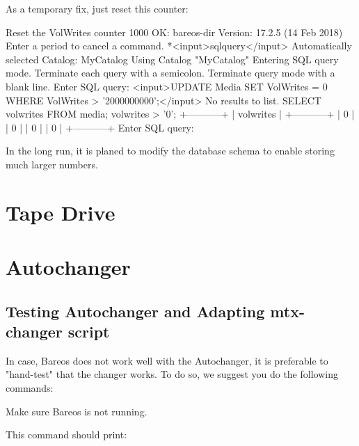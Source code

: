 As a temporary fix, just reset this counter:

\begin{bconsole}{Reset the VolWrites counter}
1000 OK: bareos-dir Version: 17.2.5 (14 Feb 2018)
Enter a period to cancel a command.
*<input>sqlquery</input>
Automatically selected Catalog: MyCatalog
Using Catalog "MyCatalog"
Entering SQL query mode.
Terminate each query with a semicolon.
Terminate query mode with a blank line.
Enter SQL query: <input>UPDATE Media SET VolWrites = 0 WHERE VolWrites > '2000000000';</input>
No results to list.
SELECT volwrites FROM media; volwrites > '0';
+-----------+
| volwrites |
+-----------+
|         0 |
|         0 |
|         0 |
|         0 |
+-----------+
Enter SQL query:
\end{bconsole}

In the long run, it is planed to modify the database schema to enable storing much larger numbers.






\section{Tape Drive}
\label{TapeTestingChapter}



\section{Autochanger}

\subsection{Testing Autochanger and Adapting mtx-changer script}
\label{AutochangerTesting}
\label{sec:MtxChangerManualUsage}

In case, Bareos does not work well with the Autochanger,
it is preferable to
"hand-test" that the changer works. To do so, we suggest you do the
following commands:

Make sure Bareos is not running.


This command should print:

